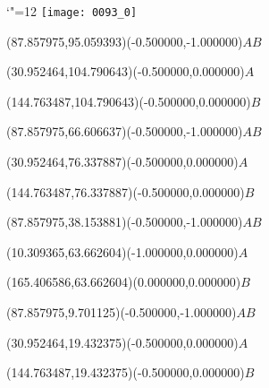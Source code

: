 \documentclass[12pt]{article}
\begin{document}
\makeatletter%
\let\ASYencoding\f@encoding%
\let\ASYfamily\f@family%
\let\ASYseries\f@series%
\let\ASYshape\f@shape%
\makeatother%
{\catcode`"=12%
\texttt{[image: 0093\_0]}%
}%
\kern -176.439571pt%
%
%
\fontsize{12.000000}{14.400000}\selectfont%
\usefont{\ASYencoding}{\ASYfamily}{\ASYseries}{\ASYshape}%
\ASYalign(87.857975,95.059393)(-0.500000,-1.000000){$AB$}%
%
%
\fontsize{12.000000}{14.400000}\selectfont%
\ASYalign(30.952464,104.790643)(-0.500000,0.000000){$A$}%
%
%
\fontsize{12.000000}{14.400000}\selectfont%
\ASYalign(144.763487,104.790643)(-0.500000,0.000000){$B$}%
%
%
\fontsize{12.000000}{14.400000}\selectfont%
\ASYalign(87.857975,66.606637)(-0.500000,-1.000000){$AB$}%
%
%
\fontsize{12.000000}{14.400000}\selectfont%
\ASYalign(30.952464,76.337887)(-0.500000,0.000000){$A$}%
%
%
\fontsize{12.000000}{14.400000}\selectfont%
\ASYalign(144.763487,76.337887)(-0.500000,0.000000){$B$}%
%
%
\fontsize{12.000000}{14.400000}\selectfont%
\ASYalign(87.857975,38.153881)(-0.500000,-1.000000){$AB$}%
%
%
\fontsize{12.000000}{14.400000}\selectfont%
\ASYalign(10.309365,63.662604)(-1.000000,0.000000){$A$}%
%
%
\fontsize{12.000000}{14.400000}\selectfont%
\ASYalign(165.406586,63.662604)(0.000000,0.000000){$B$}%
%
%
\fontsize{12.000000}{14.400000}\selectfont%
\ASYalign(87.857975,9.701125)(-0.500000,-1.000000){$AB$}%
%
%
\fontsize{12.000000}{14.400000}\selectfont%
\ASYalign(30.952464,19.432375)(-0.500000,0.000000){$A$}%
%
%
\fontsize{12.000000}{14.400000}\selectfont%
\ASYalign(144.763487,19.432375)(-0.500000,0.000000){$B$}%
\end{document}
